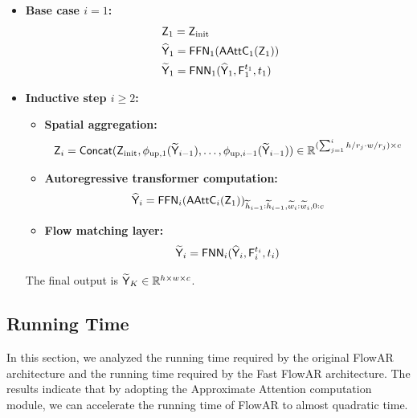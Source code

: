 \begin{definition}
\begin{itemize}
        \item {\bf Base case $i=1$:}
        \begin{align*}
            &~\mathsf{Z}_1 = \mathsf{Z}_{\mathrm{init}}\\
            &~\widehat{\mathsf{Y}}_1 = \mathsf{FFN}_1(\mathsf{AAttC}_1(\mathsf{Z}_1))\\
            &~\widetilde{\mathsf{Y}}_1 = \mathsf{FNN}_1(\widehat{\mathsf{Y}}_1,\mathsf{F}_{1}^{t_1},t_1)
        \end{align*}
        \item {\bf Inductive step $i \geq 2$:}
        \begin{itemize}
            \item {\bf Spatial aggregation:}
            \begin{align*}
                \mathsf{Z}_i = \mathsf{Concat}(\mathsf{Z}_{\mathrm{init}},\phi_{\mathrm{up},1}(\widetilde{\mathsf{Y}}_{i-1}),\dots,\phi_{\mathrm{up},i-1}(\widetilde{\mathsf{Y}}_{i-1})) \in \mathbb{R}^{(\sum_{j=1}^i h/r_j \cdot w/r_j)\times c}
            \end{align*}
            \item {\bf Autoregressive transformer computation:}
            \begin{align*}
                \widehat{\mathsf{Y}}_i = \mathsf{FFN}_i(\mathsf{AAttC}_i(\mathsf{Z}_1))_{\widetilde{h}_{i-1}:\widetilde{h}_{i-1},\widetilde{w}_{i}:\widetilde{w}_{i},0:c}
            \end{align*}
            \item {\bf Flow matching layer:}
            \begin{align*}
                \widetilde{\mathsf{Y}}_i = \mathsf{FNN}_i(\widehat{\mathsf{Y}}_i,\mathsf{F}_{i}^{t_i},t_i)
            \end{align*}
        \end{itemize}
        The final output is $\widetilde{\mathsf{Y}}_K \in \mathbb{R}^{h \times w \times c}$.
    \end{itemize}
   
\end{definition}

\subsection{Running Time}\label{sec:running_time}
In this section, we analyzed the running time required by the original FlowAR architecture and the running time required by the Fast FlowAR architecture. The results indicate that by adopting the Approximate Attention computation module, we can accelerate the running time of FlowAR to almost quadratic time.

